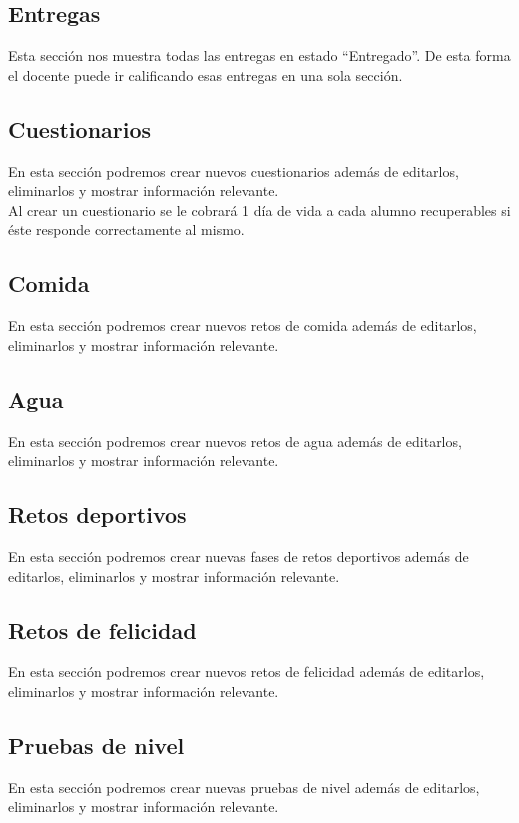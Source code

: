 \subsection{Entregas}
Esta sección nos muestra todas las entregas en estado ``Entregado''. De esta forma el docente puede ir calificando esas entregas en una sola sección.

\subsection{Cuestionarios}
En esta sección podremos crear nuevos cuestionarios además de editarlos, eliminarlos y mostrar información relevante.\\

Al crear un cuestionario se le cobrará 1 día de vida a cada alumno recuperables si éste responde correctamente al mismo.

\subsection{Comida}
En esta sección podremos crear nuevos retos de comida además de editarlos, eliminarlos y mostrar información relevante.\\

\subsection{Agua}
En esta sección podremos crear nuevos retos de agua además de editarlos, eliminarlos y mostrar información relevante.\\

\subsection{Retos deportivos}
En esta sección podremos crear nuevas fases de retos deportivos además de editarlos, eliminarlos y mostrar información relevante.\\

\subsection{Retos de felicidad}
En esta sección podremos crear nuevos retos de felicidad además de editarlos, eliminarlos y mostrar información relevante.\\

\subsection{Pruebas de nivel}
En esta sección podremos crear nuevas pruebas de nivel además de editarlos, eliminarlos y mostrar información relevante.\\

